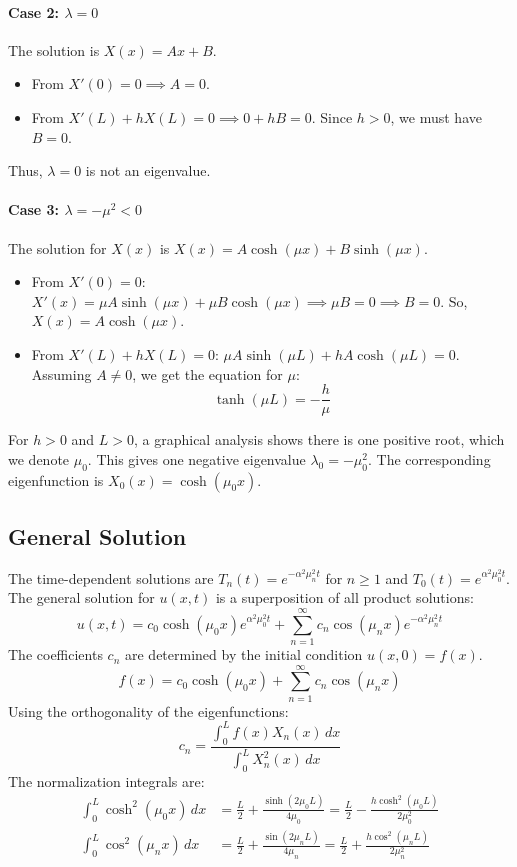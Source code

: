 \documentclass{article}
\begin{document}
	\paragraph{Case 2: $\lambda = 0$}
	The solution is $X(x) = Ax+B$.
	\begin{itemize}
		\item From $X'(0)=0 \implies A=0$.
		\item From $X'(L)+hX(L)=0 \implies 0 + hB = 0$. Since $h>0$, we must have $B=0$.
	\end{itemize}
	Thus, $\lambda=0$ is not an eigenvalue.
	
	\paragraph{Case 3: $\lambda = -\mu^2 < 0$}
	The solution for $X(x)$ is $X(x) = A\cosh(\mu x) + B\sinh(\mu x)$.
	\begin{itemize}
		\item From $X'(0)=0$: $X'(x) = \mu A\sinh(\mu x) + \mu B\cosh(\mu x) \implies \mu B = 0 \implies B=0$.
		So, $X(x) = A\cosh(\mu x)$.
		\item From $X'(L)+hX(L)=0$: $\mu A\sinh(\mu L) + hA\cosh(\mu L) = 0$.
		Assuming $A \neq 0$, we get the equation for $\mu$:
		$$
		\tanh(\mu L) = -\frac{h}{\mu}
		$$
	\end{itemize}
	For $h>0$ and $L>0$, a graphical analysis shows there is one positive root, which we denote $\mu_0$. This gives one negative eigenvalue $\lambda_0 = -\mu_0^2$. The corresponding eigenfunction is $X_0(x) = \cosh(\mu_0 x)$.
	
	\subsection*{General Solution}
	The time-dependent solutions are $T_n(t) = e^{-\alpha^2 \mu_n^2 t}$ for $n \ge 1$ and $T_0(t) = e^{\alpha^2 \mu_0^2 t}$.
	The general solution for $u(x,t)$ is a superposition of all product solutions:
	$$
	u(x,t) = c_0 \cosh(\mu_0 x) e^{\alpha^2 \mu_0^2 t} + \sum_{n=1}^{\infty} c_n \cos(\mu_n x) e^{-\alpha^2 \mu_n^2 t}
	$$
	The coefficients $c_n$ are determined by the initial condition $u(x,0) = f(x)$.
	$$
	f(x) = c_0 \cosh(\mu_0 x) + \sum_{n=1}^{\infty} c_n \cos(\mu_n x)
	$$
	Using the orthogonality of the eigenfunctions:
	$$
	c_n = \frac{\int_0^L f(x) X_n(x) \,dx}{\int_0^L X_n^2(x) \,dx}
	$$
	The normalization integrals are:
	\begin{align*}
		\int_0^L \cosh^2(\mu_0 x) \,dx &= \frac{L}{2} + \frac{\sinh(2\mu_0 L)}{4\mu_0} = \frac{L}{2} - \frac{h \cosh^2(\mu_0 L)}{2\mu_0^2} \\
		\int_0^L \cos^2(\mu_n x) \,dx &= \frac{L}{2} + \frac{\sin(2\mu_n L)}{4\mu_n} = \frac{L}{2} + \frac{h \cos^2(\mu_n L)}{2\mu_n^2}
	\end{align*}
	
\end{document}
